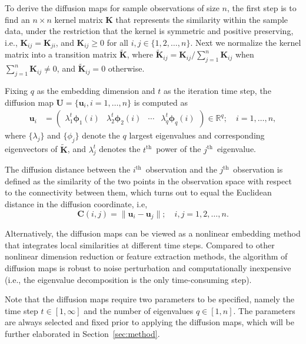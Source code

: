 \documentclass[12pt]{article}
\theoremstyle{definition}
\begin{document}
	To derive the diffusion maps for sample observations of size $n$, the first step is to find an $n \times n$ kernel matrix $\mathbf{K}$ that represents the similarity within the sample data, under the restriction that the kernel is symmetric and positive preserving, i.e., $\mathbf{K}_{ij}=\mathbf{K}_{ji}$, and $\mathbf{K}_{ij} \geq 0$ for all $i,j \in \{1, 2, \ldots, n\}$. Next we normalize the kernel matrix into a transition matrix $\mathbf{\widetilde{K}}$, where $\mathbf{\widetilde{K}}_{ij} = \mathbf{K}_{ij} / \sum\limits_{j=1}^{n} \mathbf{K}_{ij}$ when $\sum\limits_{j=1}^{n} \mathbf{K}_{ij} \neq 0$, and $\mathbf{\widetilde{K}}_{ij}=0$ otherwise.
	
	Fixing $q$ as the embedding dimension and $t$ as the iteration time step, the diffusion map $\mathbf{U}=\{\mathbf{u}_i, i=1,\ldots,n\}$ is computed as 
	\begin{align}
	\label{eq:U}
	\mathbf{u}_i  &= \begin{pmatrix} \lambda^{t}_{1} \mathbf{\phi}_{1}(i) & \lambda^{t}_{2} \mathbf{\phi}_{2} (i)  & \cdots & \lambda^{t}_{q} \mathbf{\phi}_{q}(i) \end{pmatrix} \in \mathbb{R}^{q}; \quad i = 1, \ldots, n,
	\end{align}
	where $\{ \lambda_{j} \}$ and $\{ \phi_{j}  \}$ denote the $q$ largest eigenvalues and corresponding eigenvectors of $\mathbf{\widetilde{K}}$, and $\lambda^{t}_{j}$ denotes the $t^{\mbox{th}}$~power of the $j^{\mbox{th}}$~eigenvalue.
	
	The diffusion distance between the $i^{\mbox{th}}$~observation and the $j^{\mbox{th}}$~observation is defined as the similarity of the two points in the observation space with respect to the connectivity between them, which turns out to equal the Euclidean distance in the diffusion coordinate, i.e,
	\begin{equation}
	\label{eq:diffusion}
	\mathbf{C}(i,j)  =   \| \mathbf{u}_i - \mathbf{u}_j \|; \quad i,j = 1,2, \ldots , n.
	\end{equation}
	
	Alternatively, the diffusion maps can be viewed as a nonlinear embedding method that integrates local similarities at different time steps. Compared to other nonlinear dimension reduction or feature extraction methods, the algorithm of diffusion maps is robust to noise perturbation and computationally inexpensive (i.e., the eigenvalue decomposition is the only time-consuming step). 
	
	Note that the diffusion maps require two parameters to be specified, namely the time step $t \in [1,\infty]$ and the number of eigenvalues $q \in [1,n]$. The parameters are always selected and fixed prior to applying the diffusion maps, which will be further elaborated in Section~\ref{sec:method}. 
	
\end{document}
